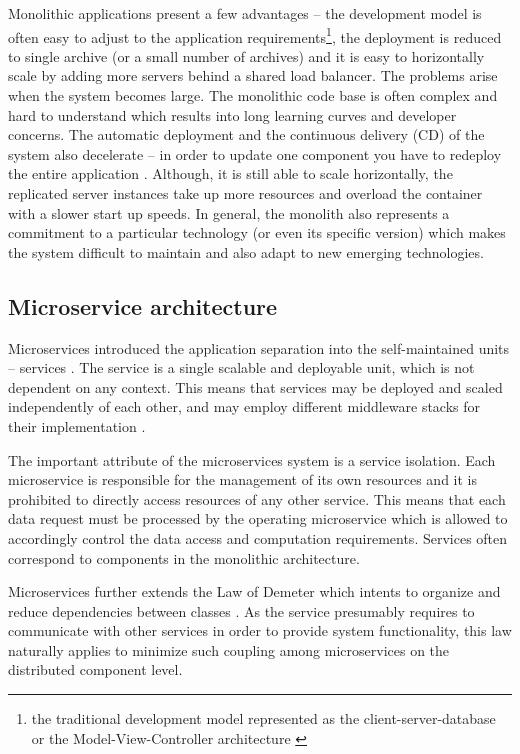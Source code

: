 \documentclass[oneside,
  digital, %
  table,   %
  nolof,     %
  nolot,     %
]{fithesis3}
\begin{document}
Monolithic applications present a few advantages -- the development model is often easy to adjust to the application requirements\footnote{the traditional development model represented as the client-server-database or the Model-View-Controller architecture \cite{mvn_architecture}}, the deployment is reduced to single archive (or a small number of archives) and it is easy to horizontally scale by adding more servers behind a shared load balancer. The problems arise when the system becomes large. The monolithic code base is often complex and hard to understand which results into long learning curves \cite{learning_curve} and developer concerns. The automatic deployment and the continuous delivery (CD) of the system also decelerate -- in order to update one component you have to redeploy the entire application \cite{monolithic_arch}. Although, it is still able to scale horizontally, the replicated server instances take up more resources and overload the container with a slower start up speeds. In general, the monolith also represents a commitment to a particular technology (or even its specific version) which makes the system difficult to maintain and also adapt to new emerging technologies.


\subsection{Microservice architecture}

Microservices introduced the application separation into the self-maintained units – services \cite{intro_to_microservices}. The service is a single scalable and deployable unit, which is not dependent on any context. This means that services may be deployed and scaled independently of each other, and may employ different middleware   stacks for their implementation \cite{ms_arch_ecommerce}. 

The important attribute of the microservices system is a service isolation. Each microservice is responsible for the management of its own resources and it is prohibited to directly access resources of any other service. This means that each data request must be processed by the operating microservice which is allowed to accordingly control the data access and computation requirements. Services often correspond to components in the monolithic architecture.

Microservices further extends the Law of Demeter which intents to organize and reduce dependencies between classes \cite{law_of_demeter}. As the service presumably requires to communicate with other services in order to provide system functionality, this law naturally applies to minimize such coupling among microservices on the distributed component level. 
\end{document}
